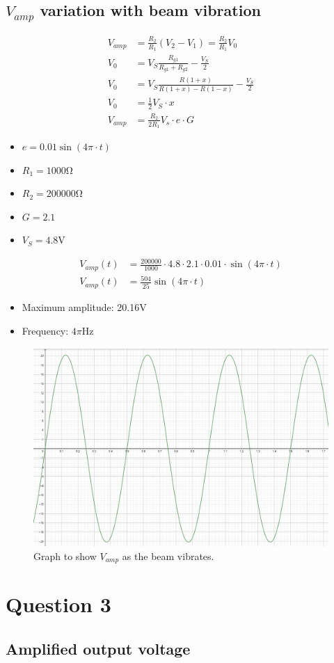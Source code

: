 \documentclass[12pt]{article}
\numberwithin{equation}{section}
\begin{document}
\subsection*{$V_{amp}$ variation with beam vibration}
\begin{align}
  V_{amp} &= \frac{R_2}{R_1} (V_2 - V_1) = \frac{R_2}{R_1} V_0\\
  V_0 &= V_S \frac{R_{g1}}{R_{g1} + R_{g2}} - \frac{V_S}{2}\\
  V_0 &= V_S \frac{R(1+x)}{R(1+x) - R(1-x)} - \frac{V_S}{2}\\
  V_0 &= \frac{1}{2}V_S \cdot x\\
  V_{amp} &= \frac{R_2}{2R_1} V_s \cdot e \cdot G
\end{align}
\begin{itemize}
  \item $e = 0.01 \sin{\left(4\pi \cdot t\right)}$
  \item $R_1 = 1000\si{\ohm}$
  \item $R_2 = 200000\si{\ohm}$
  \item $G = 2.1$
  \item $V_S = 4.8\si{\volt}$
\end{itemize}
\begin{align}
  V_{amp}(t) &= \frac{200000}{1000} \cdot 4.8 \cdot 2.1 \cdot 0.01 \cdot \sin{\left(4\pi \cdot t\right)}\\
  V_{amp}(t) &= \frac{504}{25} \sin{\left(4\pi \cdot t\right)}
\end{align}
\begin{itemize}
  \item Maximum amplitude: 20.16\si{\volt}
  \item Frequency: $4\pi \si{\hertz}$
\end{itemize}
\begin{figure}[H]
  \centering
  \includegraphics[width=\textwidth]{./img/5-2Vampresponse.png}
  \caption{Graph to show $V_{amp}$ as the beam vibrates.}
\end{figure}
\section{Question 3}
\subsection*{Amplified output voltage}
\end{document}
